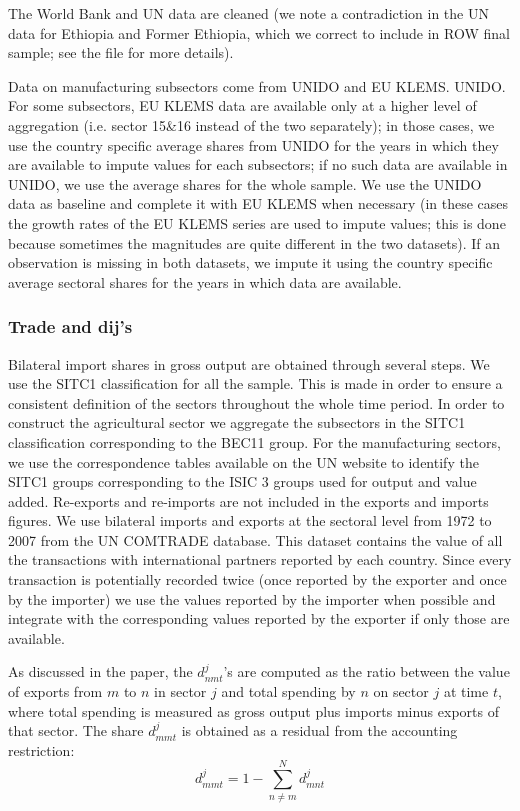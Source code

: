 \documentclass[12pt]{article}
\begin{document}
The World Bank and UN data are cleaned (we note a contradiction in the UN
data for Ethiopia and Former Ethiopia, which we correct to include in ROW
final sample; see the file for more details).

Data on manufacturing subsectors come from UNIDO and EU KLEMS. UNIDO. For
some subsectors, EU KLEMS data are available only at a higher level of
aggregation (i.e. sector 15\&16 instead of the two separately); in those
cases, we use the country specific average shares from UNIDO for the years
in which they are available to impute values for each subsectors; if no such
data are available in UNIDO, we use the average shares for the whole sample.
We use the UNIDO data as baseline and complete it with EU KLEMS when
necessary (in these cases the growth rates of the EU KLEMS series are used
to impute values; this is done because sometimes the magnitudes are quite
different in the two datasets). If an observation is missing in both
datasets, we impute it using the country specific average sectoral shares
for the years in which data are available.

\subsubsection{ Trade and dij's}

Bilateral import shares in gross output are obtained through several steps.
We use the SITC1 classification for all the sample. This is made in order to
ensure a consistent definition of the sectors throughout the whole time
period. In order to construct the agricultural sector we aggregate the
subsectors in the SITC1 classification corresponding to the BEC11 group. For
the manufacturing sectors, we use the correspondence tables available on the
UN website to identify the SITC1 groups corresponding to the ISIC 3 groups
used for output and value added. Re-exports and re-imports are not included
in the exports and imports figures. We use bilateral imports and exports at
the sectoral level from 1972 to 2007 from the UN COMTRADE database. This
dataset contains the value of all the transactions with international
partners reported by each country. Since every transaction is potentially
recorded twice (once reported by the exporter and once by the importer) we
use the values reported by the importer when possible and integrate with the
corresponding values reported by the exporter if only those are available.

As discussed in the paper, the $d_{nmt}^{j}$'s are computed as the ratio
between the value of exports from $m$ to $n$ in sector $j$ and total
spending by $n$ on sector $j$ at time $t$, where total spending is measured
as gross output plus imports minus exports of that sector. The share $%
d_{mmt}^{j}$ is obtained as a residual from the accounting restriction: 
\begin{equation*}
d_{mmt}^{j}=1-\sum\limits_{n\neq m}^{N}d_{mnt}^{j}
\end{equation*}
\end{document}
